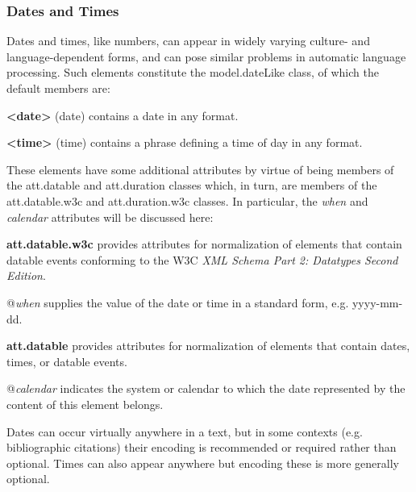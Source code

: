\subsubsection[{Dates and Times}]{Dates and Times}\label{CONADA}\par
Dates and times, like numbers, can appear in widely varying culture- and language-dependent forms, and can pose similar problems in automatic language processing. Such elements constitute the \textsf{model.dateLike} class, of which the default members are: 
\begin{sansreflist}
  
\item [\textbf{<date>}] (date) contains a date in any format.
\item [\textbf{<time>}] (time) contains a phrase defining a time of day in any format.
\end{sansreflist}
 These elements have some additional attributes by virtue of being members of the \textsf{att.datable} and \textsf{att.duration} classes which, in turn, are members of the \textsf{att.datable.w3c} and \textsf{att.duration.w3c} classes. In particular, the {\itshape when} and {\itshape calendar} attributes will be discussed here: 
\begin{sansreflist}
  
\item [\textbf{att.datable.w3c}] provides attributes for normalization of elements that contain datable events conforming to the W3C \textit{XML Schema Part 2: Datatypes Second Edition}.\hfil\\[-10pt]\begin{sansreflist}
    \item[@{\itshape when}]
  supplies the value of the date or time in a standard form, e.g. yyyy-mm-dd.
\end{sansreflist}  
\item [\textbf{att.datable}] provides attributes for normalization of elements that contain dates, times, or datable events.\hfil\\[-10pt]\begin{sansreflist}
    \item[@{\itshape calendar}]
  indicates the system or calendar to which the date represented by the content of this element belongs.
\end{sansreflist}  
\end{sansreflist}
\par
Dates can occur virtually anywhere in a text, but in some contexts (e.g. bibliographic citations) their encoding is recommended or required rather than optional. Times can also appear anywhere but encoding these is more generally optional. \par
